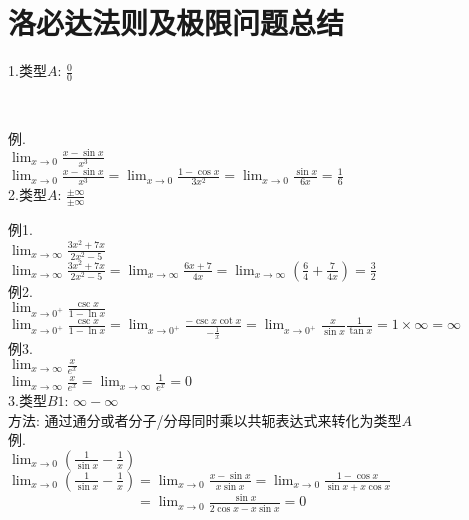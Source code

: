 \chapter{洛必达法则及极限问题总结}
1.类型$A$: $\displaystyle\frac{0}{0}$
{\par\raggedright
{}\
\par}\vspace{2ex}
例.\\
\phantom{例}$\displaystyle\lim_{x\to 0}\frac{x-\sin x}{x^3}$\\
$\displaystyle\lim_{x\to 0}\frac{x-\sin x}{x^3}=\lim_{x\to 0}\frac{1-\cos x}{3x^2}=\lim_{x\to 0}\frac{\sin x}{6x}=\frac{1}{6}$\\[2ex]

2.类型$A$: $\displaystyle\frac{\pm\infty}{\pm\infty}$
{\par\raggedright
{}
\par}\vspace{2ex}
例1.\\
\phantom{例}$\displaystyle\lim_{x\to\infty}\frac{3x^2+7x}{2x^2-5}$\\
$\displaystyle\lim_{x\to\infty}\frac{3x^2+7x}{2x^2-5}=\lim_{x\to\infty}\frac{6x+7}{4x}=\lim_{x\to\infty}(\frac{6}{4}+\frac{7}{4x})=\frac{3}{2}$\\[2ex]

例2.\\
\phantom{例}$\displaystyle\lim_{x\to 0^+}\frac{\csc x}{1-\ln x}$\\
$\displaystyle\lim_{x\to 0^+}\frac{\csc x}{1-\ln x}=\lim_{x\to 0^+}\frac{-\csc x\cot x}{-\frac{1}{x}}=\lim_{x\to 0^+}\frac{x}{\sin x}\frac{1}{\tan x}=1\times\infty=\infty$\\[2ex]

例3.\\
\phantom{例}$\displaystyle\lim_{x\to\infty}\frac{x}{e^x}$\\
$\displaystyle\lim_{x\to\infty}\frac{x}{e^x}=\lim_{x\to\infty}\frac{1}{e^x}=0$\\[2ex]

3.类型$B1$: $\infty -\infty$\\
方法: 通过通分或者分子/分母同时乘以共轭表达式来转化为类型$A$\\
例.\\
\phantom{例}$\displaystyle\lim_{x\to 0}(\frac{1}{\sin x}-\frac{1}{x})$\\
$\displaystyle\lim_{x\to 0}(\frac{1}{\sin x}-\frac{1}{x})=\lim_{x\to 0}\frac{x-\sin x}{x\sin x}=\lim_{x\to 0}\frac{1-\cos x}{\sin x+x\cos x}$\\
$\displaystyle\phantom{\lim_{x\to 0}(\frac{1}{\sin x}-\frac{1}{x})}=\lim_{x\to 0}\frac{\sin x}{2\cos x-x\sin x}=0$\\[2ex]

